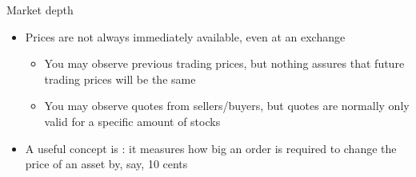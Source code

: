 \documentclass[english,10pt]{beamer}
\theoremstyle{definition}
\begin{document}
\begin{frame}{Market depth}
\begin{itemize}
	\item Prices are not always immediately available, even at an exchange
	\begin{itemize}
		\item You may observe previous trading prices, but nothing assures that future trading prices will be the same
		\item You may observe quotes from sellers/buyers, but quotes are normally only valid for a specific amount of stocks
	\end{itemize}
	\item A useful concept is : it measures how big an order is required to change the price of an asset by, say, 10 cents
\end{itemize}
\end{frame}
\end{document}
